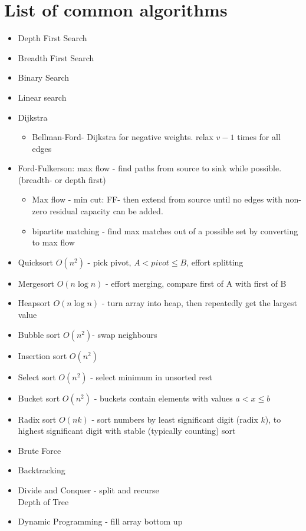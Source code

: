 \documentclass[10pt,hidelinks]{article}
\begin{document}
\section{List of common algorithms}
\begin{itemize}
\item Depth First Search
\item Breadth First Search
\item Binary Search
\item Linear search
\item Dijkstra
\begin{itemize}
\item Bellman-Ford- Dijkstra for negative weights. relax $v-1$ times for all edges
\end{itemize}
\item Ford-Fulkerson: max flow - find paths from source to sink while possible. (breadth- or depth first)
\begin{itemize}
\item Max flow - min cut: FF- then extend from source until no edges with non-zero residual capacity can be added.
\item bipartite matching - find max matches out of a possible set by converting to max flow
\end{itemize}
\item Quicksort $O(n^2)$ - pick pivot, $A<pivot \leq B$, effort splitting
\item Mergesort $O(n \log n)$ - effort merging, compare first of A with first of B
\item Heapsort $O(n \log n)$ - turn array into heap, then repeatedly get the largest value
\item Bubble sort $O(n^2)$- swap neighbours
\item Insertion sort $O(n^2)$
\item Select sort $O(n^2)$ - select minimum in unsorted rest
\item Bucket sort $O(n^2)$ - buckets contain elements with values $a < x \leq b$
\item Radix sort $O(nk)$ - sort numbers by least significant digit (radix $k$), to highest significant digit with stable (typically counting) sort
\item Brute Force
\item Backtracking
\item Divide and Conquer - split and recurse \\
	Depth of Tree
\item Dynamic Programming - fill array bottom up \\

\end{itemize}
\end{document}
